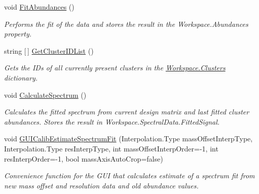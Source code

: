 \begin{DoxyCompactItemize}
void \mbox{\hyperlink{class_isotope_fit_1_1_workspace_a40fa9b2c0b5d31feae1093d08b1aad52}{Fit\+Abundances}} ()
\begin{DoxyCompactList}\small\item\em Performs the fit of the data and stores the result in the Workspace.\+Abundances property. \end{DoxyCompactList}\item 
string \mbox{[}$\,$\mbox{]} \mbox{\hyperlink{class_isotope_fit_1_1_workspace_ab0a9cd936dbf16b3bad1e34a11c2ddb1}{Get\+Cluster\+I\+D\+List}} ()
\begin{DoxyCompactList}\small\item\em Gets the I\+Ds of all currently present clusters in the \mbox{\hyperlink{class_isotope_fit_1_1_workspace_a13958fbe0adace21990cb1eabbd421e9}{Workspace.\+Clusters}} dictionary. \end{DoxyCompactList}\item 
void \mbox{\hyperlink{class_isotope_fit_1_1_workspace_af0793a9feb68a36f8f9df8ac3e1a305b}{Calculate\+Spectrum}} ()
\begin{DoxyCompactList}\small\item\em Calculates the fitted spectrum from current design matrix and last fitted cluster abundances. Stores the result in Workspace.\+Spectral\+Data.\+Fitted\+Signal. \end{DoxyCompactList}\item 
void \mbox{\hyperlink{class_isotope_fit_1_1_workspace_a19d98d4a89b048223e47593d96631d04}{G\+U\+I\+Calib\+Estimate\+Spectrum\+Fit}} (Interpolation.\+Type mass\+Offset\+Interp\+Type, Interpolation.\+Type res\+Interp\+Type, int mass\+Offset\+Interp\+Order=-\/1, int res\+Interp\+Order=-\/1, bool mass\+Axis\+Auto\+Crop=false)
\begin{DoxyCompactList}\small\item\em Convenience function for the G\+UI that calculates estimate of a spectrum fit from new mass offset and resolution data and old abundance values. \end{DoxyCompactList}\end{DoxyCompactItemize}
